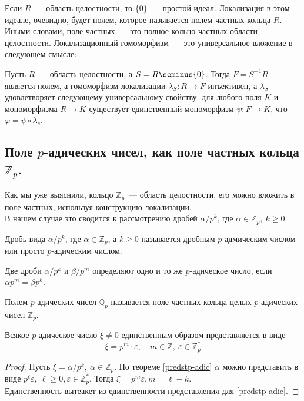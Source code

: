 \documentclass[11pt]{article}
\begin{document}
    Если $R$~--- область целостности, то $\{ 0 \}$~--- простой идеал. Локализация в этом идеале, очевидно,
    будет полем, которое называется полем частных кольца $R$.\\

    Иными словами, поле частных~--- это полное кольцо частных области целостности. Локализационный гомоморфизм~--- это
    универсальное вложение в следующем смысле:

    \begin{lemma}
        Пусть $R$~--- область целостности, а $S = R\seminus \{ 0 \}$. Тогда $F = S^{-1}R$ является полем, а гомоморфизм
        локализации $\lambda_{S}\colon R \to F$ инъективен, а $\lambda_{S}$ удовлетворяет следующему универсальному свойству:
        для любого поля $K$ и мономорфизма $R \to K$ существует единственный мономорфизм $\psi\colon F \to K$, что $\varphi = \psi \circ \lambda_s$.
    \end{lemma}

    \subsection{Поле $p$-адических чисел, как поле частных кольца $\mathbb{Z}_p$.}

    Как мы уже выяснили, кольцо $\mathbb{Z}_p$~--- область целостности, его можно вложить в поле частных, используя
    конструкцию локализации.\\
    В нашем случае это сводится к рассмотрению дробей $\alpha / p^k$, где $\alpha \in \mathbb{Z}_p, \ k \ge 0$.
    \begin{definition}
        Дробь вида $\alpha / p^k$, где $\alpha \in \mathbb{Z}_p$, а $k \ge 0$ называется дробным $p$-адмическим числом
        или просто $p$-адическим числом.
    \end{definition}
    \begin{remark}
         Две дроби $\alpha / p^k$ и $\beta / p^m$ определяют одно и то же $p$-адическое число, если $\alpha p^m = \beta p^k$.
    \end{remark}


    \begin{definition}
        Полем  $p$-адических чисел $\mathbb{Q}_p$ называется поле частных кольца целых $p$-адических чисел $\mathbb{Z}_p$.
    \end{definition}

    \begin{theorem}
        Всякое $p$-адическое число $\xi \neq 0$ единственным образом представляется в виде
        \[ \xi = p^m \cdot \varepsilon, \quad m \in \mathbb{Z}, \ \varepsilon \in \mathbb{Z}_p^{*} \]
    \end{theorem}
    \begin{proof}
        Пусть $\xi = \alpha / p^k, \ \alpha \in \mathbb{Z}_p$. По теореме \ref{predstp-adic}  $\alpha$ можно представить в виде
        $p^{\ell} \varepsilon, \ \ell \ge 0, \varepsilon \in \mathbb{Z}_p^{*}$. Тогда $\xi = p^m \varepsilon, m = \ell - k$.\\
        Единственность вытеакет из единственности представления для \ref{predstp-adic}.
    \end{proof}
\end{document}
